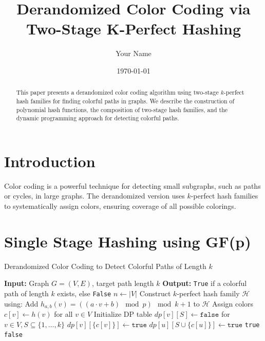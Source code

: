 \documentclass{article}
\title{Derandomized Color Coding via Two-Stage K-Perfect Hashing}
\author{Your Name}
\date{\today}
\begin{document}
\maketitle

\begin{abstract}
    This paper presents a derandomized color coding algorithm using two-stage $k$-perfect hash families for finding colorful paths in graphs. We describe the construction of polynomial hash functions, the composition of two-stage hash families, and the dynamic programming approach for detecting colorful paths.
\end{abstract}

\section{Introduction}
Color coding is a powerful technique for detecting small subgraphs, such as paths or cycles, in large graphs. The derandomized version uses $k$-perfect hash families to systematically assign colors, ensuring coverage of all possible colorings.


\section{ Single Stage Hashing using GF(p)}

\begin{algorithm}[H]
    \caption{Derandomized Color Coding to Detect Colorful Paths of Length $k$}
    \begin{algorithmic}[1]
        \State \textbf{Input:} Graph $G = (V, E)$, target path length $k$
        \State \textbf{Output:} \texttt{True} if a colorful path of length $k$ exists, else \texttt{False}
        \State $n \gets |V|$
        \State Construct $k$-perfect hash family $\mathcal{H}$ using:
        \State Add $h_{a,b}(v) = ((a \cdot v + b) \mod p) \mod k + 1$ to $\mathcal{H}$ 
        \EndFor
        \EndFor
        \State Assign colors $c[v] \gets h(v)$ for all $v \in V$
        \State Initialize DP table $dp[v][S] \gets \texttt{false}$ for $v \in V, S \subseteq \{1, \dots, k\}$
        \State $dp[v][\{c[v]\}] \gets \texttt{true}$
        \EndFor
        \State $dp[u][S \cup \{c[u]\}] \gets \texttt{true}$
        \EndIf
        \EndFor
        \EndIf
        \EndFor
        \EndFor
        \EndFor
        \State \Return \texttt{true}
        \EndIf
        \EndFor
        \EndFor
        \State \Return \texttt{false}
        \EndFunction
    \end{algorithmic}
\end{algorithm}
\end{document}
